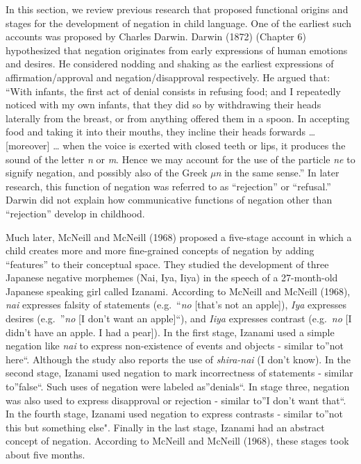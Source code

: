 \documentclass[
  english,
  man,floatsintext]{apa6}
\begin{document}
In this section, we review previous research that proposed functional origins and stages for the development of negation in child language. One of the earliest such accounts was proposed by Charles Darwin. Darwin (1872) (Chapter 6) hypothesized that negation originates from early expressions of human emotions and desires. He considered nodding and shaking as the earliest expressions of affirmation/approval and negation/disapproval respectively. He argued that: ``With infants, the first act of denial consists in refusing food; and I repeatedly noticed with my own infants, that they did so by withdrawing their heads laterally from the breast, or from anything offered them in a spoon. In accepting food and taking it into their mouths, they incline their heads forwards \ldots{} {[}moreover{]} \ldots{} when the voice is exerted with closed teeth or lips, it produces the sound of the letter \emph{n} or \emph{m}. Hence we may account for the use of the particle \emph{ne} to signify negation, and possibly also of the Greek \emph{µn} in the same sense.'' In later research, this function of negation was referred to as ``rejection'' or ``refusal.'' Darwin did not explain how communicative functions of negation other than ``rejection'' develop in childhood.

Much later, McNeill and McNeill (1968) proposed a five-stage account in which a child creates more and more fine-grained concepts of negation by adding ``features'' to their conceptual space. They studied the development of three Japanese negative morphemes (Nai, Iya, Iiya) in the speech of a 27-month-old Japanese speaking girl called Izanami. According to McNeill and McNeill (1968), \emph{nai} expresses falsity of statements (e.g.~``\emph{no} {[}that's not an apple{]}), \emph{Iya} expresses desires (e.g.~''\emph{no} {[}I don't want an apple{]}``), and \emph{Iiya} expresses contrast (e.g.~\emph{no} {[}I didn't have an apple. I had a pear{]}). In the first stage, Izanami used a simple negation like \emph{nai} to express non-existence of events and objects - similar to''not here``. Although the study also reports the use of \emph{shira-nai} (I don't know). In the second stage, Izanami used negation to mark incorrectness of statements - similar to''false``. Such uses of negation were labeled as''denials``. In stage three, negation was also used to express disapproval or rejection - similar to''I don't want that``. In the fourth stage, Izanami used negation to express contrasts - similar to''not this but something else". Finally in the last stage, Izanami had an abstract concept of negation. According to McNeill and McNeill (1968), these stages took about five months.
\end{document}
